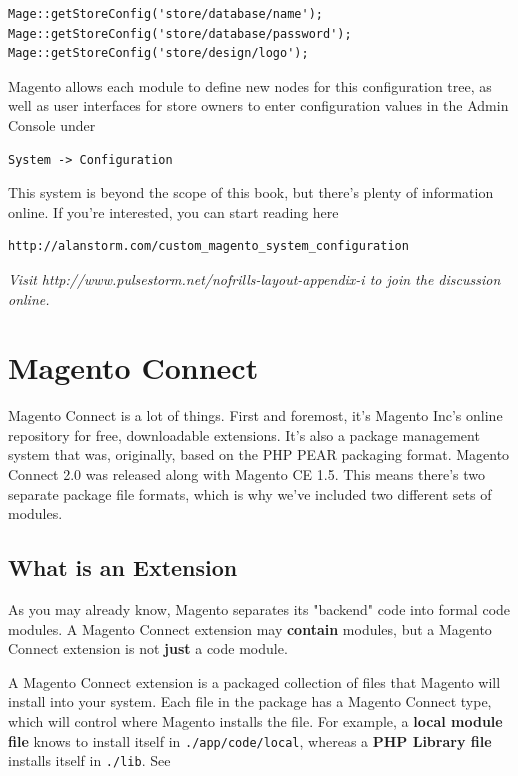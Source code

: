 \documentclass[oneside]{book}
\begin{document}
\begin{lstlisting}
Mage::getStoreConfig('store/database/name');
Mage::getStoreConfig('store/database/password');    
Mage::getStoreConfig('store/design/logo');      

\end{lstlisting}


Magento allows each module to define new nodes for this configuration tree, as well as user interfaces for store owners to enter configuration values in the Admin Console under

\begin{lstlisting}
System -> Configuration

\end{lstlisting}


This system is beyond the scope of this book, but there's plenty of information online.  If you're interested, you can start reading here

\begin{lstlisting}
http://alanstorm.com/custom_magento_system_configuration

\end{lstlisting}


\emph{Visit http://www.pulsestorm.net/nofrills-layout-appendix-i to join the discussion online.}
\chapter{Magento Connect}
Magento Connect is a lot of things.  First and foremost, it's Magento Inc's online repository for free, downloadable extensions.  It's also a package management system that was, originally, based on the PHP PEAR packaging format.  Magento Connect 2.0 was released along with Magento CE 1.5.  This means there's two separate package file formats, which is why we've included two different sets of modules. 

\section{What is an Extension}

As you may already know, Magento separates its "backend" code into formal code modules. A Magento Connect extension may \textbf{contain} modules, but a Magento Connect extension is not \textbf{just} a code module.  

A Magento Connect extension is a packaged collection of files that Magento will install into your system.  Each file in the package has a Magento Connect type, which will control where Magento installs the file.  For example, a \textbf{local module file} knows to install itself in \footnotesize\texttt{./app/code/local}\normalsize, whereas a \textbf{PHP Library file} installs itself in \footnotesize\texttt{./lib}\normalsize.  See    
\end{document}
